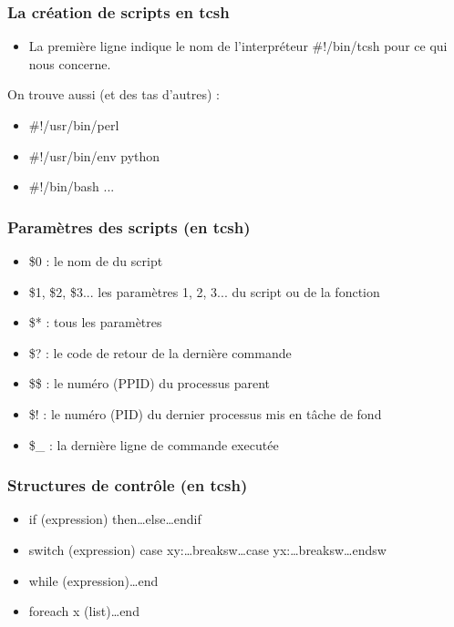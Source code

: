 \documentclass[handout,10pt]{beamer}
\begin{document}
\frame
{
    \frametitle{La création de scripts en tcsh}

    \begin{itemize}
        \item La première ligne indique le nom de l'interpréteur {\ttfamily \#!/bin/tcsh} pour ce qui nous concerne.
    \end{itemize}

    On trouve aussi (et des tas d'autres) :

    \begin{itemize}
        \item {\ttfamily \#!/usr/bin/perl}
        \item {\ttfamily \#!/usr/bin/env python}
        \item {\ttfamily \#!/bin/bash} ...
    \end{itemize}
}


\frame
{
    \frametitle{Paramètres des scripts (en tcsh)}

    \begin{itemize}
        \item {\ttfamily \$0} : le nom de du script
        \item {\ttfamily \$1, \$2, \$3}... les paramètres 1, 2, 3... du script ou de la fonction
        \item {\ttfamily \$*} : tous les paramètres
        \item {\ttfamily \$?} : le code de retour de la dernière commande
        \item {\ttfamily \$\$} : le numéro (PPID) du processus parent
        \item {\ttfamily \$!} : le numéro (PID) du dernier processus mis en tâche de fond
        \item {\ttfamily \$\_} : la dernière ligne de commande executée
    \end{itemize}

}


\frame
{
    \frametitle{Structures de contrôle (en tcsh)}

    \begin{itemize}
        \item {\ttfamily if (expression) then\dots else\dots endif}
        \item {\ttfamily switch (expression) case xy\string:\dots breaksw\dots case yx\string:\dots breaksw\dots endsw}
        \item {\ttfamily while (expression)\dots end}
        \item {\ttfamily foreach x (list)\dots end}
    \end{itemize}
}
\end{document}
